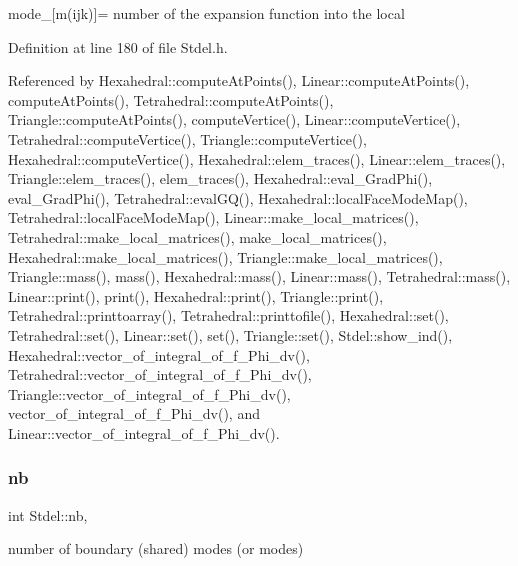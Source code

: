 mode\+\_\+\mbox{[}m(ijk)\mbox{]}= number of the expansion function into the local 



Definition at line 180 of file Stdel.\+h.



Referenced by Hexahedral\+::compute\+At\+Points(), Linear\+::compute\+At\+Points(), compute\+At\+Points(), Tetrahedral\+::compute\+At\+Points(), Triangle\+::compute\+At\+Points(), compute\+Vertice(), Linear\+::compute\+Vertice(), Tetrahedral\+::compute\+Vertice(), Triangle\+::compute\+Vertice(), Hexahedral\+::compute\+Vertice(), Hexahedral\+::elem\+\_\+traces(), Linear\+::elem\+\_\+traces(), Triangle\+::elem\+\_\+traces(), elem\+\_\+traces(), Hexahedral\+::eval\+\_\+\+Grad\+Phi(), eval\+\_\+\+Grad\+Phi(), Tetrahedral\+::eval\+G\+Q(), Hexahedral\+::local\+Face\+Mode\+Map(), Tetrahedral\+::local\+Face\+Mode\+Map(), Linear\+::make\+\_\+local\+\_\+matrices(), Tetrahedral\+::make\+\_\+local\+\_\+matrices(), make\+\_\+local\+\_\+matrices(), Hexahedral\+::make\+\_\+local\+\_\+matrices(), Triangle\+::make\+\_\+local\+\_\+matrices(), Triangle\+::mass(), mass(), Hexahedral\+::mass(), Linear\+::mass(), Tetrahedral\+::mass(), Linear\+::print(), print(), Hexahedral\+::print(), Triangle\+::print(), Tetrahedral\+::printtoarray(), Tetrahedral\+::printtofile(), Hexahedral\+::set(), Tetrahedral\+::set(), Linear\+::set(), set(), Triangle\+::set(), Stdel\+::show\+\_\+ind(), Hexahedral\+::vector\+\_\+of\+\_\+integral\+\_\+of\+\_\+f\+\_\+\+Phi\+\_\+dv(), Tetrahedral\+::vector\+\_\+of\+\_\+integral\+\_\+of\+\_\+f\+\_\+\+Phi\+\_\+dv(), Triangle\+::vector\+\_\+of\+\_\+integral\+\_\+of\+\_\+f\+\_\+\+Phi\+\_\+dv(), vector\+\_\+of\+\_\+integral\+\_\+of\+\_\+f\+\_\+\+Phi\+\_\+dv(), and Linear\+::vector\+\_\+of\+\_\+integral\+\_\+of\+\_\+f\+\_\+\+Phi\+\_\+dv().

\mbox{\label{classStdel_ad1d9acc38335d3fd779ba5c14f1507f8}} 
\subsubsection{\texorpdfstring{nb}{nb}}
{\footnotesize\ttfamily int Stdel\+::nb\hspace{0.3cm}{\ttfamily [protected]}, {\ttfamily [inherited]}}



number of boundary (shared) modes (or modes) 



